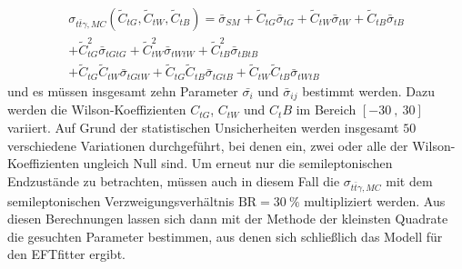 \begin{align}
  \sigma_{t\bar{t}\gamma, MC}({\tilde{C}_{tG}, \tilde{C}_{tW}, \tilde{C}_{tB}}) = \bar{\sigma}_{SM} + \tilde{C}_{tG}\bar{\sigma}_{tG} + \tilde{C}_{tW}\bar{\sigma}_{tW} + \tilde{C}_{tB}\bar{\sigma}_{tB}\\
  + \tilde{C}_{tG}^2\bar{\sigma}_{tGtG} + \tilde{C}_{tW}^2\bar{\sigma}_{tWtW} + \tilde{C}_{tB}^2\bar{\sigma}_{tBtB}\\ \nonumber
  + \tilde{C}_{tG} \tilde{C}_{tW}\bar{\sigma}_{tGtW} + \tilde{C}_{tG} \tilde{C}_{tB}\bar{\sigma}_{tGtB} + \tilde{C}_{tW} \tilde{C}_{tB}\bar{\sigma}_{tWtB} \nonumber
\end{align}
und es müssen insgesamt zehn Parameter $\bar{\sigma_i}$ und $\bar{\sigma}_{ij}$ bestimmt werden. Dazu werden die Wilson-Koeffizienten $C_{tG}$, $C_{tW}$ und $C_tB$ im Bereich $[-30~,~30]$ variiert. Auf Grund der statistischen Unsicherheiten werden insgesamt $50$ verschiedene Variationen durchgeführt, bei denen ein, zwei oder alle der Wilson-Koeffizienten ungleich Null sind.
Um erneut nur die semileptonischen Endzustände zu betrachten, müssen auch in diesem Fall die $\sigma_{t\bar{t}\gamma, MC}$ mit dem semileptonischen Verzweigungsverhältnis $\mathrm{BR} = \SI{30}{\percent}$ multipliziert werden. Aus diesen Berechnungen lassen sich dann mit der Methode der kleinsten Quadrate die gesuchten Parameter bestimmen, aus denen sich schließlich das Modell für den EFTfitter ergibt.


